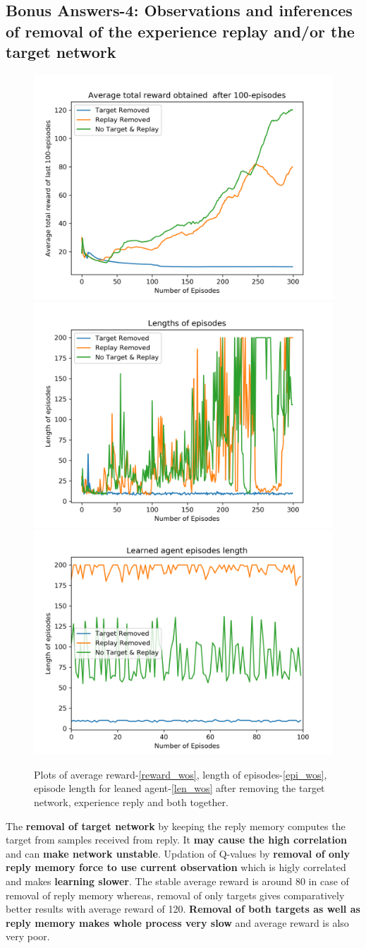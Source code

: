 \documentclass[preprint,12pt]{elsarticle}
\begin{document}
    

  
  
\subsection{Bonus Answers-4: Observations and inferences of removal of the experience replay and/or the target network}


  
    \begin{figure}[H]
    	\centering  
    	\subfigure
    	{\includegraphics[width=0.4\linewidth]{./Avg_rewards_wos.png}\label{reward_wos}}
    	\subfigure
    	{\includegraphics[width=0.4\linewidth]{./Episode_lengths_wos.png}\label{len_wos}}
    	\subfigure
    	{\includegraphics[width=0.4\linewidth]{./Learned_Episode_lengths_wos.png}\label{epi_wos}}
    	\caption{Plots of average reward-\ref{reward_wos}, length of episodes-\ref{epi_wos}, episode length for leaned agent-\ref{len_wos} after removing the target network, experience reply and both together. }
    	\label{fig:without}
    \end{figure}
	
	The \textbf{removal of target network} by keeping the reply memory computes the target from samples received from reply. It \textbf{may cause the high correlation }and can \textbf{make network unstable}. Updation of Q-values by \textbf{removal of only reply memory force to use current observation} which is higly correlated and makes \textbf{learning slower}. The stable average reward is around 80 in case of removal of reply memory whereas, removal of only targets gives comparatively better results with average reward of 120. \textbf{Removal of both targets as well as reply memory makes whole process very slow }and average reward is also very poor.
	
\end{document}
